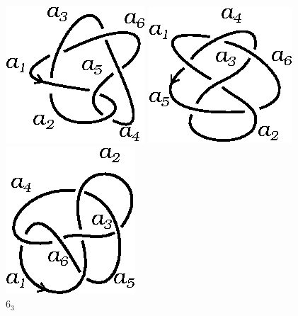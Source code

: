 \documentclass[graybox]{svmult}
\begin{document}
\begin{figure}[ht]
		\centering
		\begin{minipage}{0.4\textwidth}
			\centering
		    \includegraphics[scale=0.7]{images/6_1}
			\caption{$6_1$}
			\label{fig:6_1}
		\end{minipage}
		\begin{minipage}{0.4\textwidth}
			\centering
		    \includegraphics[scale=0.7]{images/6_2}
			\caption{$6_2$}
			\label{fig:6_2}
		\end{minipage}
		\begin{minipage}{0.4\textwidth}
			\centering
		    \includegraphics[scale=0.7]{images/6_3}
			\caption{$6_3$}
			\label{fig:6_3}
		\end{minipage}
	\end{figure}
\end{document}
